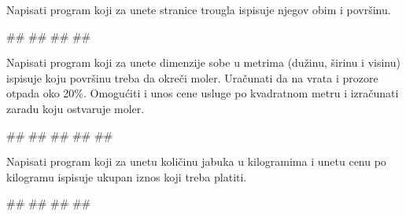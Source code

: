 \begin{Exercise}[label=p1_03] 
Napisati program koji za unete stranice trougla ispisuje njegov obim i površinu.\\
\begin{miditest}
\begin{upotreba}{1}
#\naslovInt#
##
##
##
\end{upotreba}
\end{miditest}
\end{Exercise}
\begin{Answer}[ref=p1_03]
\end{Answer}


\begin{Exercise}[label=p1_04] 
Napisati program koji za unete dimenzije sobe u metrima (dužinu,
širinu i visinu) ispisuje koju površinu treba da okreči
moler. Uračunati da na vrata i prozore otpada oko 20\%. Omogućiti i
unos cene usluge po kvadratnom metru i izračunati zaradu koju
ostvaruje moler.\\
\begin{miditest}
\begin{upotreba}{1}
#\naslovInt#
##
##
##
##
\end{upotreba}
\end{miditest}
\end{Exercise}
\begin{Answer}[ref=p1_04]
\end{Answer}



\begin{Exercise}[label=p1_05] 
Napisati program koji za unetu količinu jabuka u kilogramima i unetu
cenu po kilogramu ispisuje ukupan iznos koji treba platiti.\\
\begin{miditest}
\begin{upotreba}{1}
#\naslovInt#
##
##
##
\end{upotreba}
\end{miditest}
\end{Exercise}
\begin{Answer}[ref=p1_05]
\end{Answer}


